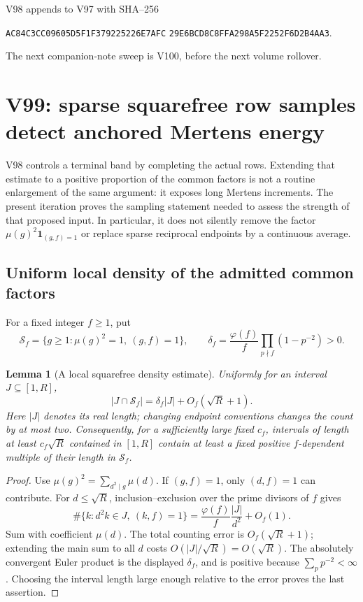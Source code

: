 \documentclass[11pt]{article}
\newtheorem{lemma}[theorem]{Lemma}
\theoremstyle{definition}
\theoremstyle{remark}
\begin{document}
V98 appends to V97 with SHA--256
\begin{center}
\texttt{AC84C3CC09605D5F1F379225226E7AFC}\allowbreak
\texttt{29E6BCD8C8FFA298A5F2252F6D2B4AA3}.
\end{center}
The next companion-note sweep is V100, before the next volume rollover.
\endgroup

\clearpage
\section{V99: sparse squarefree row samples detect anchored Mertens energy}
\label{sec:f2v99-sparse-sampling}
\begingroup
\setcounter{equation}{0}
\renewcommand{\theequation}{N99.\arabic{equation}}
\renewcommand{\theHequation}{f2v99.\arabic{equation}}

V98 controls a terminal band by completing the actual rows.  Extending
that estimate to a positive proportion of the common factors is not
a routine enlargement of the same argument: it exposes long Mertens
increments.  The present iteration proves the sampling statement
needed to assess the strength of that proposed input.  In particular,
it does not silently remove the factor \(\mu(g)^2\mathbf1_{(g,f)=1}\)
or replace sparse reciprocal endpoints by a continuous average.

\subsection{Uniform local density of the admitted common factors}

For a fixed integer \(f\ge1\), put
\[
 \mathcal S_f=\{g\ge1:\mu(g)^2=1,\ (g,f)=1\},\qquad
 \delta_f=\frac{\varphi(f)}f\prod_{p\nmid f}(1-p^{-2})>0.
\]

\begin{lemma}[A local squarefree density estimate]
\label{lem:f2v99-density}
Uniformly for an interval \(J\subseteq[1,R]\),
\begin{equation}
 |J\cap\mathcal S_f|=\delta_f|J|+O_f(\sqrt R+1).
 \label{eq:f2v99-density}
\end{equation}
Here \(|J|\) denotes its real length; changing endpoint conventions
changes the count by at most two.  Consequently, for a sufficiently
large fixed \(c_f\), intervals of length at least
\(c_f\sqrt R\) contained in \([1,R]\) contain at least a fixed
positive \(f\)-dependent multiple of their length in \(\mathcal S_f\).
\end{lemma}

\begin{proof}
Use \(\mu(g)^2=\sum_{d^2\mid g}\mu(d)\).  If \((g,f)=1\),
only \((d,f)=1\) can contribute.  For \(d\le\sqrt R\),
inclusion--exclusion over the prime divisors of \(f\) gives
\[
 \#\{k:d^2k\in J,\ (k,f)=1\}
       =\frac{\varphi(f)}f\frac{|J|}{d^2}+O_f(1).
\]
Sum with coefficient \(\mu(d)\).  The total counting error is
\(O_f(\sqrt R+1)\); extending the main sum to all \(d\) costs
\(O(|J|/\sqrt R)=O(\sqrt R)\).  The absolutely convergent Euler
product is the displayed \(\delta_f\), and is positive because
\(\sum_p p^{-2}<\infty\).  Choosing the interval length large
enough relative to the error proves the last assertion.
\end{proof}
\end{document}
